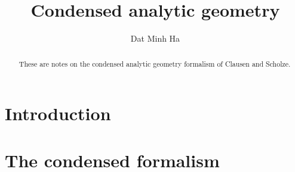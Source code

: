 

\setcounter{section}{-1}





    \title{Condensed analytic geometry}
    
    \author{Dat Minh Ha}
    \maketitle
    
    \begin{abstract}
        These are notes on the condensed analytic geometry formalism of Clausen and Scholze.
    \end{abstract}
    
    {
      \hypersetup{} 
      \tableofcontents %
    }

    \section{Introduction}

    \section{The condensed formalism} \label{section: condensed_mathematics}
